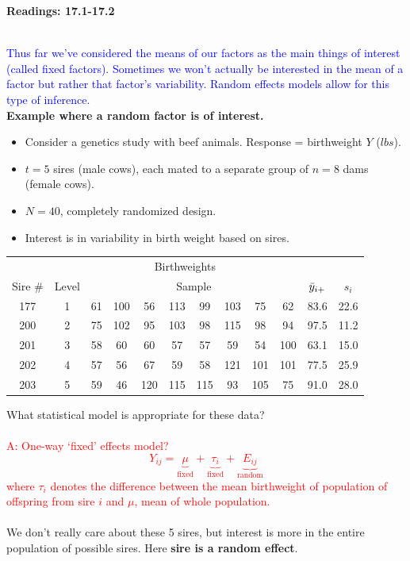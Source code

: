 \begin{center}\large\textbf{Readings: 17.1-17.2}\\
\normalsize \end{center}
\large ~\hrulefill
~\\
\textcolor{blue}{Thus far we've considered the means of our factors as the main things of interest (called fixed factors).  Sometimes we won't actually be interested in the mean of a factor but rather that factor's variability.  Random effects models allow for this type of inference.}\\

\textbf{Example where a random factor is of interest.}
\begin{itemize}
\item Consider a genetics study with beef animals.  Response = birthweight $Y$ ($lbs$).
\item $t=5$ sires (male cows), each mated to a separate group of $n=8$ dams (female cows).
\item $N=40$, completely randomized design. 
\item Interest is in variability in birth weight based on sires.
\end{itemize}
\begin{center}
\begin{tabular}{cc|cccccccc|c|c}
\multicolumn{12}{c}{Birthweights} \\
Sire \# & Level & \multicolumn{8}{c|}{Sample} & $\bar{y}_{i +}$ & $s_i$ \\ \hline
177 & 1 & 61 & 100 & 56 & 113 & 99 & 103 & 75 & 62 & 83.6 & 22.6 \\
200 & 2 & 75 & 102 & 95 & 103 & 98 & 115 & 98 & 94 & 97.5 & 11.2\\
201 & 3 & 58 & 60  & 60 & 57 & 57 & 59 & 54 & 100 &  63.1 & 15.0\\
202 & 4 & 57 & 56  & 67 & 59 & 58 & 121 & 101 & 101& 77.5 & 25.9\\
203 & 5 & 59 & 46  & 120 & 115 & 115 & 93 & 105 & 75&91.0 & 28.0 \\ \hline 
\end{tabular}
\end{center}
What statistical model is appropriate for these data?  \\~\\
\textcolor{red}{A: One-way `fixed' effects model?
$$ Y_{ij} = \underbrace{\mu}_{\text{fixed}} + \underbrace{\tau_i}_{\text{fixed}} + \underbrace{E_{ij}}_{\text{random}}$$
where $\tau_i$ denotes the difference between the mean birthweight of population of offspring from sire $i$ and $\mu$, mean of whole population.}\\~\\
We don't really care about these 5 sires, but interest is more in the entire population of possible sires.  Here \textbf{sire is a random effect}.

